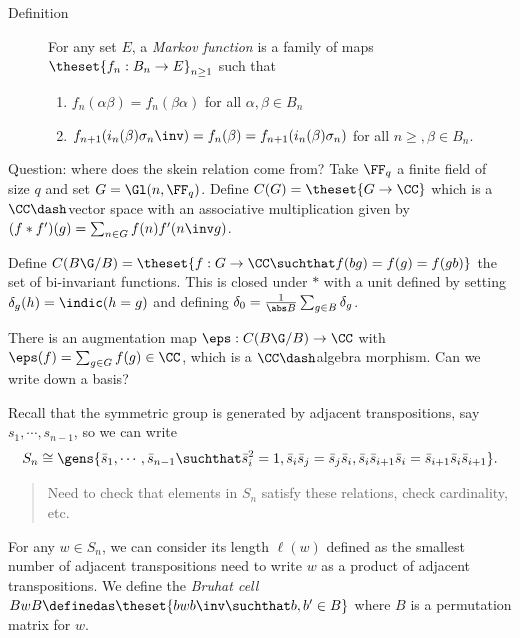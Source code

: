 \begin{description}
\item[Definition]
For any set \(E\), a \emph{Markov function} is a family of maps
\(\theset{f_n: B_n \to E}_{n\geq 1}\) such that

\begin{enumerate}
\def\labelenumi{\arabic{enumi}.}
\item
  \(f_n(\alpha \beta) = f_n(\beta\alpha)\) for all
  \(\alpha, \beta\in B_n\)
\item
  \(f_{n+1}(i_n(\beta)\sigma_n\inv) = f_n(\beta) = f_{n+1}(i_n(\beta) \sigma_n)\)
  for all \(n\geq, \beta \in B_n\).
\end{enumerate}
\end{description}

Question: where does the skein relation come from? Take \(\FF_q\) a
finite field of size \(q\) and set \(G = \Gl(n, \FF_q)\). Define
\(C(G) = \theset{G\to \CC}\) which is a \(\CC\dash\)vector space with an
associative multiplication given by
\((f\ast f')(g) = \sum_{n\in G} f(n) f'(n\inv g)\).

Define
\(C(B\G/B) = \theset{f: G\to \CC \suchthat f(bg) = f(g) = f(gb)}\) the
set of bi-invariant functions. This is closed under \(\ast\) with a unit
defined by setting \(\delta_g(h) = \indic(h=g)\) and defining
\(\delta_0 = {1\over \abs B} \sum_{g\in B} \delta_g\).

There is an augmentation map \(\eps: C(B\G/B) \to \CC\) with
\(\eps(f) = \sum_{g\in G} f(g) \in \CC\), which is a \(\CC\dash\)algebra
morphism. Can we write down a basis?

Recall that the symmetric group is generated by adjacent transpositions,
say \(s_1, \cdots, s_{n-1}\), so we can write \begin{align*}
S_n \cong \gens{\bar s_1, \cdots, \bar s_{n-1} \suchthat \bar s_i^2 = 1, \bar s_i \bar s_j = \bar s_j \bar s_i, \bar s_i \bar s_{i+1} \bar s_i = \bar s_{i+1} \bar s_i \bar s_{i+1} }
.\end{align*}

\begin{quote}
Need to check that elements in \(S_n\) satisfy these relations, check
cardinality, etc.
\end{quote}

For any \(w\in S_n\), we can consider its length \(\ell(w)\) defined as
the smallest number of adjacent transpositions need to write \(w\) as a
product of adjacent transpositions. We define the \emph{Bruhat cell}
\(B w B \definedas \theset{bwb\inv \suchthat b, b' \in B}\) where \(B\)
is a permutation matrix for \(w\).

